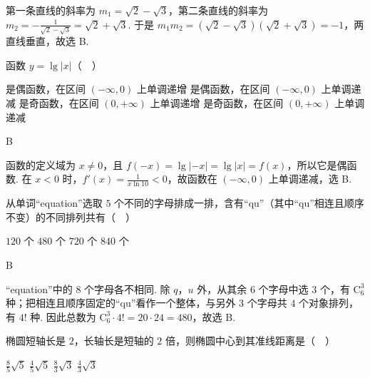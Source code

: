 \begin{solution}
第一条直线的斜率为 \(m_1=\sqrt{2}-\sqrt{3}\)，第二条直线的斜率为 \(m_2=-\frac{1}{\sqrt{2}-\sqrt{3}}=\sqrt{2}+\sqrt{3}\). 于是 \(m_1m_2=(\sqrt{2}-\sqrt{3})(\sqrt{2}+\sqrt{3})=-1\)，两直线垂直，故选 B.
\end{solution}

\begin{problem}
函数 \(y=\lg|x|\)（\(\quad\)）

\choices
    {是偶函数，在区间 \((-\infty,0)\) 上单调递增}
    {是偶函数，在区间 \((-\infty,0)\) 上单调递减}
    {是奇函数，在区间 \((0,+\infty)\) 上单调递增}
    {是奇函数，在区间 \((0,+\infty)\) 上单调递减}
\end{problem}

\begin{answer}
B
\end{answer}

\begin{solution}
函数的定义域为 \(x\neq0\)，且 \(f(-x)=\lg|-x|=\lg|x|=f(x)\)，所以它是偶函数. 在 \(x<0\) 时，\(f'(x)=\frac{1}{x\ln10}<0\)，故函数在 \((-\infty,0)\) 上单调递减，选 B.
\end{solution}

\begin{problem}
从单词“equation”选取 \(5\) 个不同的字母排成一排，含有“qu”（其中“qu”相连且顺序不变）的不同排列共有（\(\quad\)）

\choices
    {\(120\) 个}
    {\(480\) 个}
    {\(720\) 个}
    {\(840\) 个}
\end{problem}

\begin{answer}
B
\end{answer}

\begin{solution}
“equation”中的 \(8\) 个字母各不相同. 除 \(q\)，\(u\) 外，从其余 \(6\) 个字母中选 \(3\) 个，有 \(\mathrm C_6^3\) 种；把相连且顺序固定的“qu”看作一个整体，与另外 \(3\) 个字母共 \(4\) 个对象排列，有 \(4!\) 种. 因此总数为 \(\mathrm C_6^3\cdot4!=20\cdot24=480\)，故选 B.
\end{solution}

\begin{problem}
椭圆短轴长是 \(2\)，长轴长是短轴的 \(2\) 倍，则椭圆中心到其准线距离是（\(\quad\)）

\choices
    {\(\frac{8}{5}\sqrt{5}\)}
    {\(\frac{4}{5}\sqrt{5}\)}
    {\(\frac{8}{3}\sqrt{3}\)}
    {\(\frac{4}{3}\sqrt{3}\)}
\end{problem}


